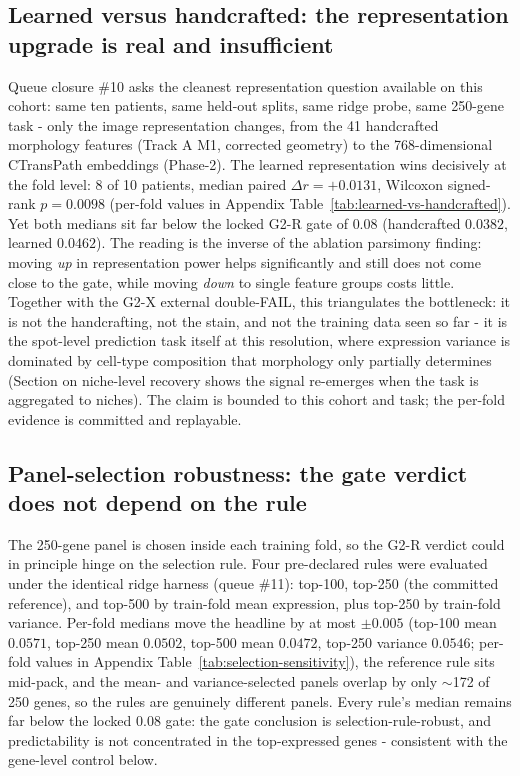 \documentclass[11pt]{article}
\begin{document}
\subsection{Learned versus handcrafted: the representation upgrade is real and insufficient}
Queue closure \#10 asks the cleanest representation question available on
this cohort: same ten patients, same held-out splits, same ridge probe,
same 250-gene task - only the image representation changes, from the 41
handcrafted morphology features (Track A M1, corrected geometry) to the
768-dimensional CTransPath embeddings (Phase-2). The learned representation
wins decisively at the fold level: 8 of 10 patients, median paired
$\Delta r = +0.0131$, Wilcoxon signed-rank $p = 0.0098$ (per-fold values in
Appendix Table~\ref{tab:learned-vs-handcrafted}). Yet both medians sit far
below the locked G2-R gate of $0.08$ (handcrafted $0.0382$, learned
$0.0462$). The reading is the inverse of the ablation parsimony finding:
moving \emph{up} in representation power helps significantly and still does
not come close to the gate, while moving \emph{down} to single feature
groups costs little. Together with the G2-X external double-FAIL, this
triangulates the bottleneck: it is not the handcrafting, not the stain, and
not the training data seen so far - it is the spot-level prediction task
itself at this resolution, where expression variance is dominated by
cell-type composition that morphology only partially determines
(Section on niche-level recovery shows the signal re-emerges when the task
is aggregated to niches). The claim is bounded to this cohort and task; the
per-fold evidence is committed and replayable.

\subsection{Panel-selection robustness: the gate verdict does not depend on the rule}
The 250-gene panel is chosen inside each training fold, so the G2-R verdict
could in principle hinge on the selection rule. Four pre-declared rules were
evaluated under the identical ridge harness (queue \#11): top-100, top-250
(the committed reference), and top-500 by train-fold mean expression, plus
top-250 by train-fold variance. Per-fold medians move the headline by at most
$\pm 0.005$ (top-100 mean $0.0571$, top-250 mean
$0.0502$, top-500 mean $0.0472$, top-250
variance $0.0546$; per-fold values in Appendix
Table~\ref{tab:selection-sensitivity}), the reference rule sits mid-pack,
and the mean- and variance-selected panels overlap by only $\sim$172 of 250
genes, so the rules are genuinely different panels. Every rule's median
remains far below the locked $0.08$ gate: the gate conclusion is
selection-rule-robust, and predictability is not concentrated in the
top-expressed genes - consistent with the gene-level control below.
\end{document}
